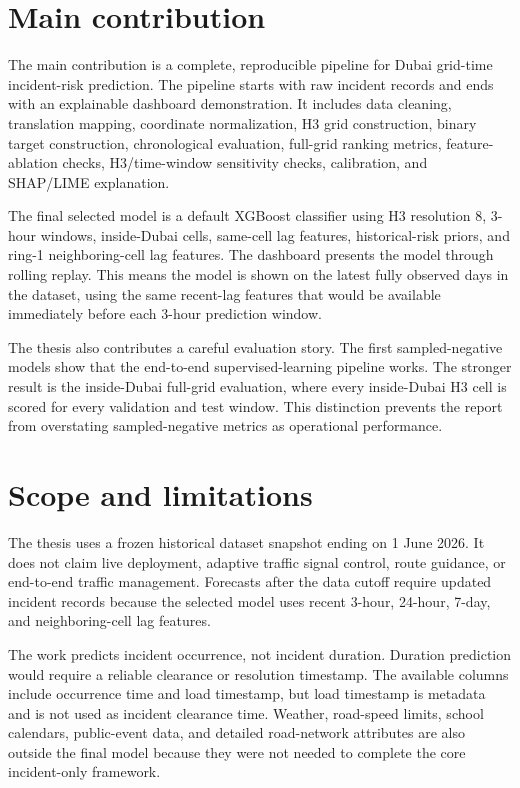 \section{Main contribution}

The main contribution is a complete, reproducible pipeline for Dubai grid-time incident-risk prediction. The pipeline starts with raw incident records and ends with an explainable dashboard demonstration. It includes data cleaning, translation mapping, coordinate normalization, H3 grid construction, binary target construction, chronological evaluation, full-grid ranking metrics, feature-ablation checks, H3/time-window sensitivity checks, calibration, and SHAP/LIME explanation.

The final selected model is a default XGBoost classifier using H3 resolution 8, 3-hour windows, inside-Dubai cells, same-cell lag features, historical-risk priors, and ring-1 neighboring-cell lag features. The dashboard presents the model through rolling replay. This means the model is shown on the latest fully observed days in the dataset, using the same recent-lag features that would be available immediately before each 3-hour prediction window.

The thesis also contributes a careful evaluation story. The first sampled-negative models show that the end-to-end supervised-learning pipeline works. The stronger result is the inside-Dubai full-grid evaluation, where every inside-Dubai H3 cell is scored for every validation and test window. This distinction prevents the report from overstating sampled-negative metrics as operational performance.

\section{Scope and limitations}

The thesis uses a frozen historical dataset snapshot ending on 1 June 2026. It does not claim live deployment, adaptive traffic signal control, route guidance, or end-to-end traffic management. Forecasts after the data cutoff require updated incident records because the selected model uses recent 3-hour, 24-hour, 7-day, and neighboring-cell lag features.

The work predicts incident occurrence, not incident duration. Duration prediction would require a reliable clearance or resolution timestamp. The available columns include occurrence time and load timestamp, but load timestamp is metadata and is not used as incident clearance time. Weather, road-speed limits, school calendars, public-event data, and detailed road-network attributes are also outside the final model because they were not needed to complete the core incident-only framework.

